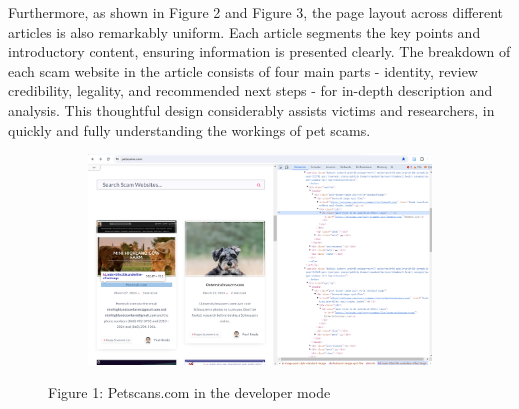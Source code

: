 \documentclass[ oneside,%
                    author={Cassie Qing Tang},
                    degree={BSc},
                     title={An Automated Response System for Disrupting Online Pet Scamming \\ },
                    subtitle={ }]{dissertation}
\begin{document}
Furthermore, as shown in Figure 2 and Figure 3, the page layout across different articles is also remarkably uniform. Each article segments the key points and introductory content, ensuring information is presented clearly. The breakdown of each scam website in the article consists of four main parts - identity, review credibility, legality, and recommended next steps - for in-depth description and analysis. This thoughtful design considerably assists victims and researchers, in quickly and fully understanding the workings of pet scams.
\begin{figure}[!htb]
    \centering
    \begin{subfigure}[b]{0.7\textwidth}
        \includegraphics[width=\linewidth,height=0.25\textheight]{pic/figure1.png}
        \label{fig:petscams}
    \end{subfigure}
    \caption{Figure 1: Petscans.com in the developer mode}
    \label{fig:main1}
\end{figure}
\end{document}
